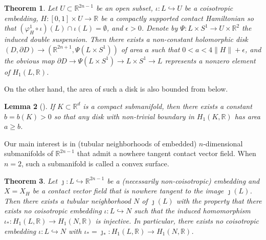 \documentclass{amsart}
\newtheorem{thm}{Theorem}[section]
\newtheorem{lem}[thm]{Lemma}
\theoremstyle{remark}
\def\p{{\partial}}
\def\R{{\mathbb R}}
\begin{document}
\begin{thm} \label{thm:non-constant-disk}
Let $U \subset \R^{2 n - 1}$ be an open subset, $\iota \colon L \hookrightarrow U$ be a coisotropic embedding, $H \colon [0, 1] \times U \to \R$ be a compactly supported contact Hamiltonian so that $(\varphi_H^1 \circ \iota) (L) \cap \iota (L) = \emptyset$, and $\epsilon > 0$.
Denote by $\Psi \colon L \times S^1 \to U \times \R^2$ the induced double suspension.
Then there exists a non-constant holomorphic disk $(D, \p D) \to (\R^{2 n + 1}, \Psi (L \times S^1))$ of area $a$ such that $0 < a < 4 \| H \| + \epsilon$, and the obvious map $\p D \to \Psi (L \times S^1) \to L \times S^1 \to L$ represents a nonzero element of $H_1 (L, \R)$.
\end{thm}

On the other hand, the area of such a disk is also bounded from below.

\begin{lem}[{\cite{laudenbach:hdl94}}] \label{topo-area-bound}
If $K \subset \R^d$ is a compact submanifold, then there exists a constant $b = b (K) > 0$ so that any disk with non-trivial boundary in $H_1 (K, \R)$ has area $a \ge b$.
\end{lem}

Our main interest is in (tubular neighborhoods of embedded) $n$-dimensional submanifolds of $\R^{2 n - 1}$ that admit a nowhere tangent contact vector field.
When $n = 2$, such a submanifold is called a convex surface.

\begin{thm} \label{thm:empty-shape}
Let $\jmath \colon L \hookrightarrow \R^{2 n - 1}$ be a (necessarily non-coisotropic) embedding and $X = X_H$ be a contact vector field that is nowhere tangent to the image $\jmath (L)$.
Then there exists a tubular neighborhood $N$ of $\jmath (L)$ with the property that there exists no coisotropic embedding $\iota \colon L \hookrightarrow N$ such that the induced homomorphism $\iota_* \colon H_1 (L, \R) \to H_1 (N, \R)$ is injective.
In particular, there exists no coisotropic embedding $\iota \colon L \hookrightarrow N$ with $\iota_* = \jmath_* \colon H_1 (L, \R) \to H_1 (N, \R)$.
\end{thm}
\end{document}

